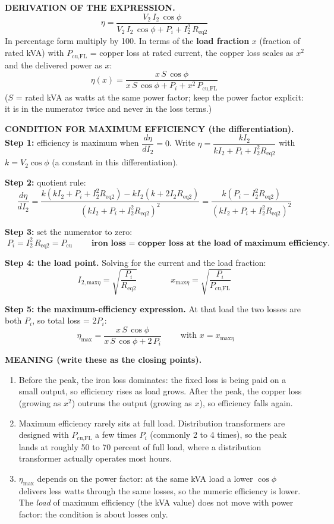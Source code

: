 \documentclass[11pt]{article}
\newcommand{\tagline}[1]{\textbf{\color{copper}#1}}
\begin{document}
\tagline{DERIVATION OF THE EXPRESSION.}
\[
\boxed{\;\eta = \frac{V_2\, I_2\, \cos\phi}{V_2\, I_2\, \cos\phi + P_i + I_2^{2}\, R_{\text{eq2}}}\;}
\]
In percentage form multiply by 100. In terms of the \textbf{load fraction} $x$ (fraction of rated kVA) with $P_{\text{cu,FL}}$ = copper loss at rated current, the copper loss scales as $x^{2}$ and the delivered power as $x$:
\[
\boxed{\;\eta(x) = \frac{x\, S\, \cos\phi}{x\, S\, \cos\phi + P_i + x^{2}\, P_{\text{cu,FL}}}\;}
\]
($S$ = rated kVA as watts at the same power factor; keep the power factor explicit: it is in the numerator twice and never in the loss terms.)

\tagline{CONDITION FOR MAXIMUM EFFICIENCY (the differentiation).}
\textbf{Step 1:} efficiency is maximum when $\dfrac{d\eta}{dI_2} = 0$. Write $\eta = \dfrac{k I_2}{k I_2 + P_i + I_2^{2} R_{\text{eq2}}}$ with $k = V_2\cos\phi$ (a constant in this differentiation).

\textbf{Step 2:} quotient rule:
\[
\frac{d\eta}{dI_2} = \frac{k\left(k I_2 + P_i + I_2^{2} R_{\text{eq2}}\right) - k I_2\left(k + 2 I_2 R_{\text{eq2}}\right)}{\left(k I_2 + P_i + I_2^{2} R_{\text{eq2}}\right)^{2}} = \frac{k\left(P_i - I_2^{2} R_{\text{eq2}}\right)}{\left(k I_2 + P_i + I_2^{2} R_{\text{eq2}}\right)^{2}}
\]

\textbf{Step 3:} set the numerator to zero:
\[
\boxed{\;P_i = I_2^{2}\, R_{\text{eq2}} = P_{\text{cu}}\;}
\qquad\textbf{iron loss = copper loss at the load of maximum efficiency.}
\]

\textbf{Step 4: the load point.} Solving for the current and the load fraction:
\[
I_{2,\text{max}\eta} = \sqrt{\frac{P_i}{R_{\text{eq2}}}}
\qquad\qquad
x_{\text{max}\eta} = \sqrt{\frac{P_i}{P_{\text{cu,FL}}}}
\]

\textbf{Step 5: the maximum-efficiency expression.} At that load the two losses are both $P_i$, so total loss = $2 P_i$:
\[
\boxed{\;\eta_{\text{max}} = \frac{x\, S\, \cos\phi}{x\, S\, \cos\phi + 2\, P_i}\;}
\qquad\text{with } x = x_{\text{max}\eta}
\]

\tagline{MEANING (write these as the closing points).}
\begin{enumerate}[label=\arabic*.]
\item Before the peak, the iron loss dominates: the fixed loss is being paid on a small output, so efficiency rises as load grows. After the peak, the copper loss (growing as $x^{2}$) outruns the output (growing as $x$), so efficiency falls again.
\item Maximum efficiency rarely sits at full load. Distribution transformers are designed with $P_{\text{cu,FL}}$ a few times $P_i$ (commonly 2 to 4 times), so the peak lands at roughly 50 to 70 percent of full load, where a distribution transformer actually operates most hours.
\item $\eta_{\text{max}}$ depends on the power factor: at the same kVA load a lower $\cos\phi$ delivers less watts through the same losses, so the numeric efficiency is lower. The \emph{load} of maximum efficiency (the kVA value) does not move with power factor: the condition is about losses only.
\end{enumerate}
\end{document}
